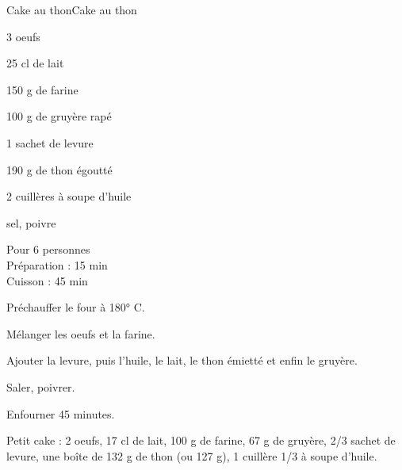 \begin{recette}{Cake au thon}{Cake au thon}

\begin{ingredients}
3 oeufs\par
25 cl de lait\par
150 g de farine\par
100 g de gruyère rapé\par
1 sachet de levure\par
190 g de thon égoutté\par
2 cuillères à soupe d'huile\par
sel, poivre\par
\end{ingredients}

\begin{infos}
Pour 6 personnes\\
Préparation : 15 min\\
Cuisson : 45 min\\
\end{infos}

\begin{etapes}
\item Préchauffer le four à 180° C.
\item Mélanger les oeufs et la farine.
\item Ajouter la levure, puis l'huile, le lait, le thon émietté et enfin le gruyère.
\item Saler, poivrer.
\item Enfourner 45 minutes.
\end{etapes}

\begin{conseils}
Petit cake : 2 oeufs, 17 cl de lait, 100 g de farine, 67 g de gruyère, 2/3 sachet de levure, une boîte de 132 g de thon (ou 127 g), 1 cuillère 1/3 à soupe d'huile.
\end{conseils}

\end{recette}
